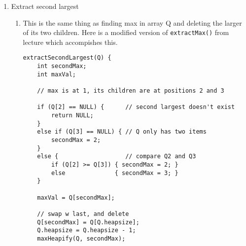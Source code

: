 \documentclass{article}
\begin{document}
\begin{enumerate}
\begin{enumerate}
        Derived from pseudo-code in Lecture 1 slides:
        \begin{lstlisting}[
        linebackgroundcolor={%
        \ifnum\value{lstnumber}=2
                \color{green!35}
        \fi
        \ifnum\value{lstnumber}=7
                \color{green!35}
        \fi
        \ifnum\value{lstnumber}=29
                \color{green!35}
        \fi
                },
]
mergeSortInversions(A,p,r) {
    inv = 0; // variable to track inversions
    if (p < r) {
        q = floor((p+r)/2)
        mergeSortInversions(A,p,q)
        mergeSortInversions(A, q+1, r)
        merge(A,p,q,r,inv)
    }
    return inv;
}
            
merge(A, p, q, r, inv) {
    n1 = q - p + 1
    n2 = r - q
    copy A[p,q] to L[1...n1]
    copy A[q+1,r] to R[1...n2]
    L[n1+1] = R[n1+1] = +Inf
    i = j = 1
    for (k=p to r) {
        if (L[i] < R[j]) {
            A[k] = L[i]
            i++
        } else {
            // a value R[j] was taken from the right 
            // side in the process of merging;
            // R[j] must be an inversion relative to 
            // everything remaining on the left side
            A[k] = R[j]
            inv += L.length - i
            j++
        }
    }
}
        \end{lstlisting}
    \end{enumerate}
    
    \item Extract second largest
    
    \begin{enumerate}
    	\item This is the same thing as finding max in array Q and deleting the larger of its two children. Here is a modified version of \texttt{extractMax()} from lecture which accompishes this.
    	\begin{lstlisting}
extractSecondLargest(Q) {
	int secondMax;
	int maxVal;

	// max is at 1, its children are at positions 2 and 3
	
	if (Q[2] == NULL) {      // second largest doesn't exist
		return NULL;
	} 
	else if (Q[3] == NULL) { // Q only has two items
		secondMax = 2;
	} 
	else {                   // compare Q2 and Q3
		if (Q[2] >= Q[3]) { secondMax = 2; } 
		else              { secondMax = 3; }
	}
	
	maxVal = Q[secondMax];	
	
	// swap w last, and delete	
	Q[secondMax] = Q[Q.heapsize];
	Q.heapsize = Q.heapsize - 1;
	maxHeapify(Q, secondMax);
	

\end{lstlisting}
\end{enumerate}
\end{enumerate}
\end{document}
